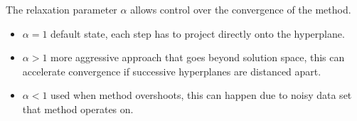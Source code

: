 The relaxation parameter $\alpha$ allows control over the convergence of the method. 
\begin{itemize}
    \item $\alpha = 1$ default state, each step has to project directly onto the hyperplane.
    \item $\alpha > 1$ more aggressive approach that goes beyond solution space, this can accelerate convergence if successive hyperplanes are distanced apart.
    \item $\alpha < 1$ used when method overshoots, this can happen due to noisy data set that method operates on. 
\end{itemize}
